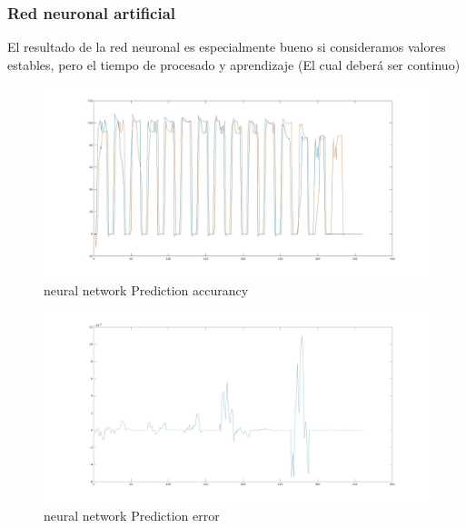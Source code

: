 \subsubsection{Red neuronal artificial} 
\label{ssub:nn}

El resultado de la red neuronal es especialmente bueno si consideramos valores estables, pero el tiempo de procesado y aprendizaje (El cual deberá ser continuo)

\begin{figure}[h]
    \includegraphics[width=\textwidth]{nn.jpg}
    \caption{neural network Prediction accurancy}
    \label{fig:nn_comp}
\end{figure}

\begin{figure}[h]
    \includegraphics[width=\textwidth]{nn_error.jpg}
    \caption{neural network Prediction error}
    \label{fig:nn_error}
\end{figure}

